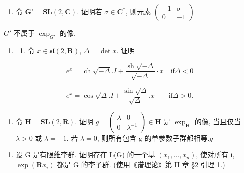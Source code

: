 \begin{enumerate}
\def\labelenumi{(\alph{enumi})}
\setcounter{enumi}{1}
\tightlist
\item
  令 \(\mathbf{G}' = \mathbf{SL}(2, \mathbf{C})\). 证明若 \(\sigma \in \mathbf{C}^*\), 则元素 \(\left( \begin{array}{cc} -1 & \sigma \\ 0 & -1 \end{array} \right)\)
\end{enumerate}

\(G'\) 不属于 \(\exp_{G'}\) 的像.

\begin{enumerate}
\def\labelenumi{\arabic{enumi}.}
\setcounter{enumi}{14}
\tightlist
\item
  \begin{enumerate}
  \def\labelenumii{(\alph{enumii})}
  \tightlist
  \item
    令 \(x \in \mathfrak{sl}(2, \mathbf{R})\), \(\Delta = \det x\). 证明
  \end{enumerate}
\end{enumerate}

\[
e ^ {x} = \operatorname{ch} \sqrt {- \Delta}. I + \frac {\operatorname{sh} \sqrt {- \Delta}}{\sqrt {- \Delta}} \cdot x \quad \mathrm{if} \Delta <   0
\]

\[
e ^ {x} = \cos {\sqrt {\Delta}}. I + \frac {\sin {\sqrt {\Delta}}}{\sqrt {\Delta}}. x \qquad \mathrm{if} \Delta > 0.
\]

\begin{enumerate}
\def\labelenumi{(\alph{enumi})}
\setcounter{enumi}{1}
\tightlist
\item
  令 \(\mathbf{H} = \mathbf{SL}(2, \mathbf{R})\). 证明 \(g = \begin{pmatrix} \lambda & 0 \\ 0 & \lambda^{-1} \end{pmatrix} \in \mathbf{H}\) 是 \(\exp_{\mathbf{H}}\) 的像, 当且仅当 \(\lambda > 0\) 或 \(\lambda = -1\). 若 \(\lambda = 0\), 则所有包含 g 的单参数子群都相等.\(g\)
\end{enumerate}

\begin{enumerate}
\def\labelenumi{\arabic{enumi}.}
\setcounter{enumi}{15}
\tightlist
\item
  设 G 是有限维李群. 证明存在 L(G) 的一个基 \((x_{1},\ldots,x_{n})\), 使对所有 i, \(\exp(\mathbf{R}x_{i})\) 都是 G 的李子群. (使用《谱理论》第 II 章 §2 引理 1.)
\end{enumerate}

